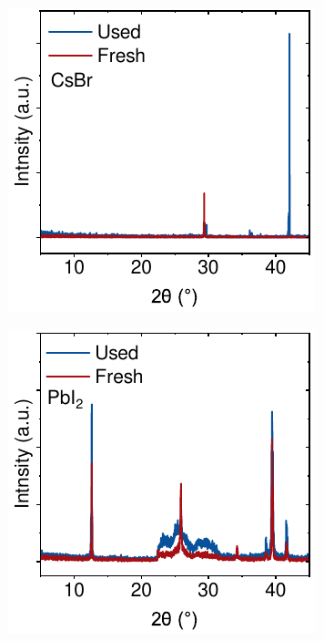 \begin{figure}[htbp]
    \centering
    \begin{subfigure}[t]{0.4\textwidth} %
        \centering
        \includegraphics[width=\textwidth]{chapters/stability/imeges/CsBr_Powder.pdf} %
        \caption{}
        \label{}
    \end{subfigure}
    \begin{subfigure}[t]{0.4\textwidth} %
        \centering
        \includegraphics[width=\textwidth]{chapters/stability/imeges/PbI2_Powder.pdf} %
        \caption{}        
        \label{}
    \end{subfigure}


\end{figure}
